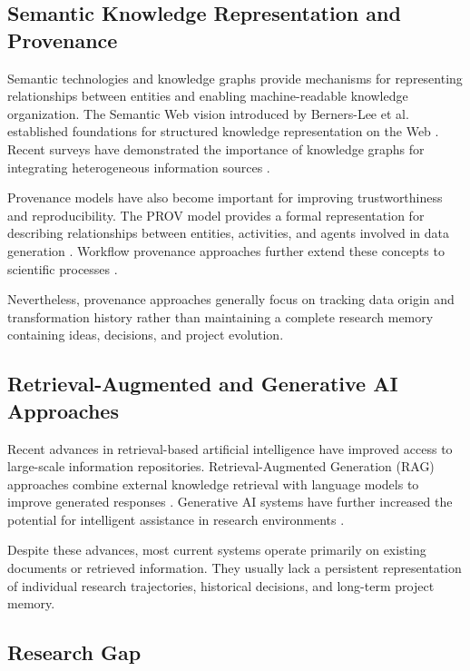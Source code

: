 \subsection{Semantic Knowledge Representation and Provenance}

Semantic technologies and knowledge graphs provide mechanisms for
representing relationships between entities and enabling machine-readable
knowledge organization. The Semantic Web vision introduced by
Berners-Lee et al. established foundations for structured knowledge
representation on the Web
\cite{bernerslee2001semantic}. Recent surveys have demonstrated the
importance of knowledge graphs for integrating heterogeneous information
sources
\cite{hogan2021knowledge}.

Provenance models have also become important for improving
trustworthiness and reproducibility. The PROV model provides a formal
representation for describing relationships between entities,
activities, and agents involved in data generation
\cite{moreau2013prov}. Workflow provenance approaches further extend
these concepts to scientific processes
\cite{garijo2013workflow}.

Nevertheless, provenance approaches generally focus on tracking data
origin and transformation history rather than maintaining a complete
research memory containing ideas, decisions, and project evolution.


\subsection{Retrieval-Augmented and Generative AI Approaches}

Recent advances in retrieval-based artificial intelligence have improved
access to large-scale information repositories. Retrieval-Augmented
Generation (RAG) approaches combine external knowledge retrieval with
language models to improve generated responses
\cite{lewis2020retrieval}. Generative AI systems have further increased
the potential for intelligent assistance in research environments
\cite{park2023generative}.

Despite these advances, most current systems operate primarily on
existing documents or retrieved information. They usually lack a
persistent representation of individual research trajectories, historical
decisions, and long-term project memory.


\subsection{Research Gap}

